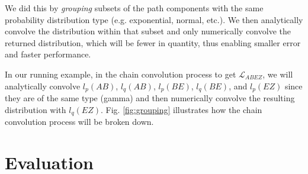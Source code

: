 \documentclass[10pt,sigconf,letterpaper,anonymous,nonacm]{acmart}
\begin{document}
We did this by \textit{grouping} subsets of the path components with the same probability distribution 
type (e.g. exponential, normal, etc.). 
We then analytically convolve the distribution within that subset and only numerically convolve the 
returned distribution, which will be fewer in quantity, thus enabling smaller error and faster performance.

In our running example, in the chain convolution process to get $\mathcal{L}_{ABEZ}$, we will analytically
convolve $l_p(AB)$, $l_q(AB)$, $l_p(BE)$, $l_q(BE)$, and $l_p(EZ)$ since they are of the same type (gamma) 
and then numerically convolve the resulting distribution with $l_q(EZ)$.
Fig. \ref{fig:grouping} illustrates how the chain convolution process will be broken down.





\section{Evaluation}
\end{document}
